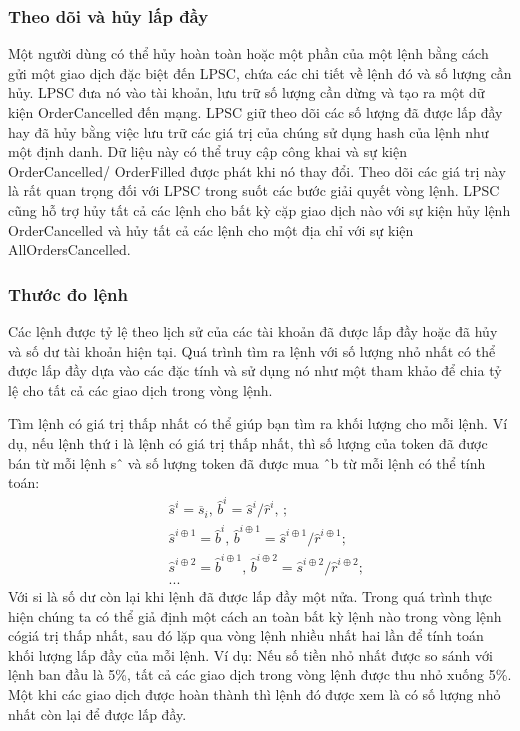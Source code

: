 \documentclass[12pt,a4paper]{article}
\begin{document}
\begin{multicols}{2}
\subsubsection{Theo dõi và hủy lấp đầy}
Một người dùng có thể hủy hoàn toàn hoặc một phần của một lệnh bằng cách gửi một giao dịch đặc biệt đến LPSC, chứa các chi tiết về lệnh đó và số lượng cần hủy. LPSC đưa nó vào tài khoản, lưu trữ số lượng cần dừng và tạo ra một dữ kiện OrderCancelled đến mạng. LPSC giữ theo dõi các số lượng đã được lấp đầy hay đã hủy bằng việc lưu trữ các giá trị của chúng sử dụng hash của lệnh như một định danh. Dữ liệu này có thể truy cập công khai và sự kiện OrderCancelled/ OrderFilled được phát khi nó thay đổi.  Theo dõi các giá trị này là rất quan trọng đối với LPSC trong suốt các bước giải quyết vòng lệnh.
 	LPSC cũng hỗ trợ hủy tất cả các lệnh cho bất kỳ cặp giao dịch nào với sự kiện hủy lệnh OrderCancelled và hủy tất cả các lệnh cho một địa chỉ với sự kiện AllOrdersCancelled.

\subsubsection{Thước đo lệnh\label{sec:order_scaling}}
Các lệnh được tỷ lệ theo lịch sử của các tài khoản đã được lấp đầy hoặc đã hủy và số dư tài khoản hiện tại. Quá trình tìm ra lệnh với số lượng nhỏ nhất có thể được lấp đầy dựa vào các đặc tính và sử dụng nó như một tham khảo để chia tỷ lệ cho tất cả các giao dịch trong vòng lệnh.

Tìm lệnh có giá trị thấp nhất có thể giúp bạn tìm ra khối lượng cho mỗi lệnh. Ví dụ, nếu lệnh thứ i là lệnh có giá trị thấp nhất, thì số lượng của token đã được bán từ mỗi lệnh sˆ và số lượng token đã được mua ˆb  từ mỗi lệnh có thể tính toán:
\[
\begin{split}
&\hat{s}^{i}=\overline{s}_i\text{, } \hat{b}^{i}=\hat{s}^{i}/ \hat{r}^i\text{, }\text{;}\\
&\hat{s}^{i\oplus 1}=\hat{b}^i\text{, } \hat{b}^{i\oplus 1}=\hat{s}^{i\oplus 1}/ \hat{r}^{i\oplus 1}\text{;}\\
&\hat{s}^{i\oplus 2}=\hat{b}^{i\oplus 1}\text{, } \hat{b}^{i\oplus 2}=\hat{s}^{i\oplus 2}/ \hat{r}^{i\oplus 2}\text{;}\\
& ...
\end{split}
\]
Với     si   là số dư còn lại khi lệnh đã được lấp đầy một nửa.
Trong quá trình thực hiện chúng ta có thể giả định một cách an toàn bất kỳ lệnh nào trong vòng lệnh cógiá trị thấp nhất, sau đó lặp qua vòng lệnh nhiều nhất hai lần để tính toán khối lượng lấp đầy của mỗi lệnh.
Ví dụ: Nếu số tiền nhỏ nhất được so sánh với lệnh ban đầu là 5\%, tất cả các giao dịch trong vòng lệnh được thu nhỏ xuống 5\%. Một khi các giao dịch được hoàn thành thì lệnh đó được xem là có số lượng nhỏ nhất còn lại để được lấp đầy.


\end{multicols}
\end{document}
